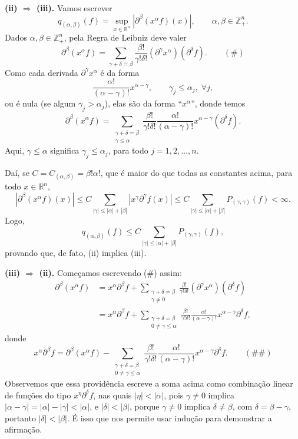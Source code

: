 \documentclass[../distribution_theory_notes.tex]{subfiles}
\begin{document}
\begin{proof*}
	\textbf{(ii) \(\Rightarrow\) (iii).} Vamos escrever
	\[
		q_{(\alpha ,\beta )}(f)=\sup_{x\in \mathbb{R}^{n}}|\partial ^{\beta }(x^{\alpha }f)(x)|,
		\qquad \alpha ,\beta \in \mathbb{Z}_{+}^{n}.
	\]
	Dados \(\alpha ,\beta \in \mathbb{Z}_{+}^{n}\), pela Regra de Leibniz deve valer
	\[
		\partial ^{\beta }(x^{\alpha }f)
		=\sum_{\gamma +\delta =\beta }\frac{\beta !}{\gamma !\delta !}(\partial ^{\gamma }x^{\alpha })(\partial ^{\delta }f). \qquad (\#)
	\]
	Como cada derivada \(\partial ^{\gamma }x^{\alpha }\) é da forma
	\[
		\frac{\alpha !}{(\alpha -\gamma )!}x^{\alpha -\gamma },\qquad \gamma _{j}\leq \alpha _{j},\; \forall j,
	\]
	ou é nula (se algum \(\gamma _{j}>\alpha _{j}\)), elas são da forma ``\(x^{\alpha }\)'', donde temos
	\[
		\partial ^{\beta }(x^{\alpha }f)
		=\sum_{\substack{\gamma +\delta =\beta \\ \gamma \leq \alpha }}
		\frac{\beta !}{\gamma !\delta !}\frac{\alpha !}{(\alpha -\gamma )!}
		x^{\alpha -\gamma }(\partial ^{\delta }f).
	\]
	Aqui, \(\gamma \leq \alpha \) significa \(\gamma _{j}\leq \alpha _{j}\), para todo \(j=1,2,\dotsc ,n\).

	Daí, se \(C=C_{(\alpha ,\beta )}=\beta !\alpha !\), que é maior do que todas as constantes acima, para todo \(x\in \mathbb{R}^{n}\),
	\[
		|\partial ^{\beta }(x^{\alpha }f)(x)|
		\leq C\sum_{|\gamma |\leq |\alpha |+|\beta |}|x^{\gamma }\partial ^{\gamma }f(x)|
		\leq C\sum_{|\gamma |\leq |\alpha |+|\beta |}P_{(\gamma ,\gamma )}(f)<\infty .
	\]
	Logo,
	\[
		q_{(\alpha ,\beta )}(f)\leq C\sum_{|\gamma |\leq |\alpha |+|\beta |}P_{(\gamma ,\gamma )}(f),
	\]
	provando que, de fato, (ii) implica (iii).

	\textbf{(iii) \(\Rightarrow\) (ii).} Começamos escrevendo (\#) assim:
	\begin{align*}
		\partial ^{\beta }(x^{\alpha }f)
		 & =x^{\alpha }\partial ^{\beta }f
		+\sum_{\substack{\gamma +\delta =\beta                                                 \\ \gamma \neq 0}}
		\frac{\beta !}{\gamma !\delta !}(\partial ^{\gamma }x^{\alpha })(\partial ^{\delta }f) \\
		 & =x^{\alpha }\partial ^{\beta }f
		+\sum_{\substack{\gamma +\delta =\beta                                                 \\ 0\neq \gamma \leq \alpha }}
		\frac{\beta !}{\gamma !\delta !}\frac{\alpha !}{(\alpha -\gamma )!}x^{\alpha -\gamma }\partial ^{\delta }f,
	\end{align*}
	donde
	\[
		x^{\alpha }\partial ^{\beta }f
		=\partial ^{\beta }(x^{\alpha }f)
		-\sum_{\substack{\gamma +\delta =\beta \\ 0\neq \gamma \leq \alpha }}
		\frac{\beta !}{\gamma !\delta !}\frac{\alpha !}{(\alpha -\gamma )!}x^{\alpha -\gamma }\partial ^{\delta }f. \qquad (\#\#)
	\]
	Observemos que essa providência escreve a soma acima como combinação linear de funções do tipo \(x^{\eta }\partial ^{\delta }f\), nas quais \(|\eta |<|\alpha |\), pois \(\gamma \neq 0\) implica \(|\alpha -\gamma |=|\alpha |-|\gamma |<|\alpha |\), e \(|\delta |<|\beta |\), porque \(\gamma \neq 0\) implica \(\delta \neq \beta \), com \(\delta =\beta -\gamma \), portanto \(|\delta |<|\beta |\). É isso que nos permite usar indução para demonstrar a afirmação.


\end{proof*}
\end{document}
